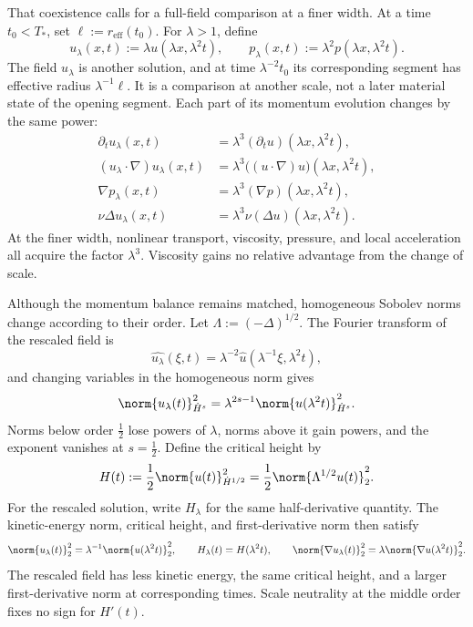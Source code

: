 That coexistence calls for a full-field comparison at a finer width. At a time \(t_0<T_*\), set \(\ell:=r_{\mathrm{eff}}(t_0)\). For \(\lambda>1\), define
\[
  u_\lambda(x,t)
  :=
  \lambda u(\lambda x,\lambda^2t),
  \qquad
  p_\lambda(x,t)
  :=
  \lambda^2p(\lambda x,\lambda^2t).
\]
The field \(u_\lambda\) is another solution, and at time \(\lambda^{-2}t_0\) its corresponding segment has effective radius \(\lambda^{-1}\ell\). It is a comparison at another scale, not a later material state of the opening segment. Each part of its momentum evolution changes by the same power:
\[
\begin{aligned}
  \partial_tu_\lambda(x,t)
  &=
  \lambda^3(\partial_tu)(\lambda x,\lambda^2t),
  \\
  (u_\lambda\cdot\nabla)u_\lambda(x,t)
  &=
  \lambda^3\bigl((u\cdot\nabla)u\bigr)(\lambda x,\lambda^2t),
  \\
  \nabla p_\lambda(x,t)
  &=
  \lambda^3(\nabla p)(\lambda x,\lambda^2t),
  \\
  \nu\Delta u_\lambda(x,t)
  &=
  \lambda^3\nu(\Delta u)(\lambda x,\lambda^2t).
\end{aligned}
\]
At the finer width, nonlinear transport, viscosity, pressure, and local acceleration all acquire the factor \(\lambda^3\). Viscosity gains no relative advantage from the change of scale.


Although the momentum balance remains matched, homogeneous Sobolev norms change according to their order. Let \(\Lambda:=(-\Delta)^{1/2}\). The Fourier transform of the rescaled field is
\[
  \widehat{u_\lambda}(\xi,t)
  =
  \lambda^{-2}\widehat u(\lambda^{-1}\xi,\lambda^2t),
\]
and changing variables in the homogeneous norm gives
\[
  \norm{u_\lambda(t)}_{\dot H^s}^2
  =
  \lambda^{2s-1}
  \norm{u(\lambda^2t)}_{\dot H^s}^2.
\]
Norms below order \(\tfrac12\) lose powers of \(\lambda\), norms above it gain powers, and the exponent vanishes at \(s=\tfrac12\). Define the critical height by
\[
  H(t)
  :=
  \frac12\norm{u(t)}_{\dot H^{1/2}}^2
  =
  \frac12\norm{\Lambda^{1/2}u(t)}_2^2.
\]
For the rescaled solution, write \(H_\lambda\) for the same half-derivative quantity. The kinetic-energy norm, critical height, and first-derivative norm then satisfy
\[
  \norm{u_\lambda(t)}_2^2
  =
  \lambda^{-1}\norm{u(\lambda^2t)}_2^2,
  \qquad
  H_\lambda(t)=H(\lambda^2t),
  \qquad
  \norm{\nabla u_\lambda(t)}_2^2
  =
  \lambda\norm{\nabla u(\lambda^2t)}_2^2.
\]
The rescaled field has less kinetic energy, the same critical height, and a larger first-derivative norm at corresponding times. Scale neutrality at the middle order fixes no sign for \(H'(t)\).

